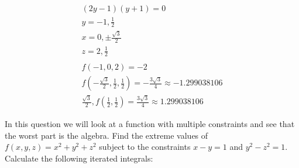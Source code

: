 \documentclass[12pt]{exam}
\begin{document}
\begin{questions}
\begin{solution}
\begin{gather*}
            (2y-1)(y+1) = 0 \\
            y = -1, \frac{1}{2} \\
            x = 0, \pm \frac{\sqrt{3}}{2} \\
            z = 2, \frac{1}{2}\\
            \\
            \boxed {f(-1, 0, 2) = -2} \\
            f(-\frac{\sqrt{3}}{2}, \frac{1}{2}, \frac{1}{2}) = -\frac{3\sqrt{3}}{4} \approx -1.299038106 \\
            \boxed {\frac{\sqrt{3}}{2}, f(\frac{1}{2}, \frac{1}{2}) = \frac{3\sqrt{3}}{4} \approx 1.299038106}
        \end{gather*}
    \end{solution}
\question In this question we will look at a function with multiple constraints and see that the worst part is the
algebra. Find the extreme values of $f (x, y, z) = x^2 + y^2 + z^2$ subject to the constraints $x - y = 1$ and $y^2 - z^2 = 1$.
\question Calculate the following iterated integrals:
\end{questions}
\end{document}
